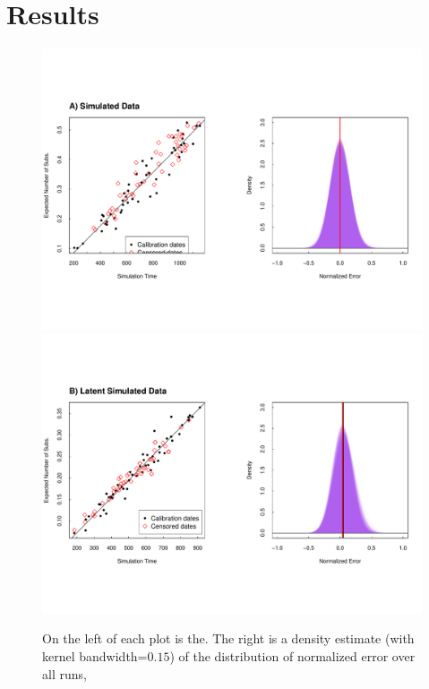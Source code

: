 \section{Results} \label{sec:results}

\begin{figure} \label{fig:results1}
	\centering
	\includegraphics[trim=0cm 0cm 0cm 6cm, clip=true, scale=0.425]{figures/simulated.pdf} \\
	\includegraphics[trim=0cm 0cm 0cm 7cm, clip=true,scale=0.425]{figures/simulated_latent.pdf}\\
	\caption[Examples]{On the left of each plot is the. The right is a density estimate (with kernel bandwidth=$0.15$) of the distribution of normalized error over all runs,  }
\end{figure}

